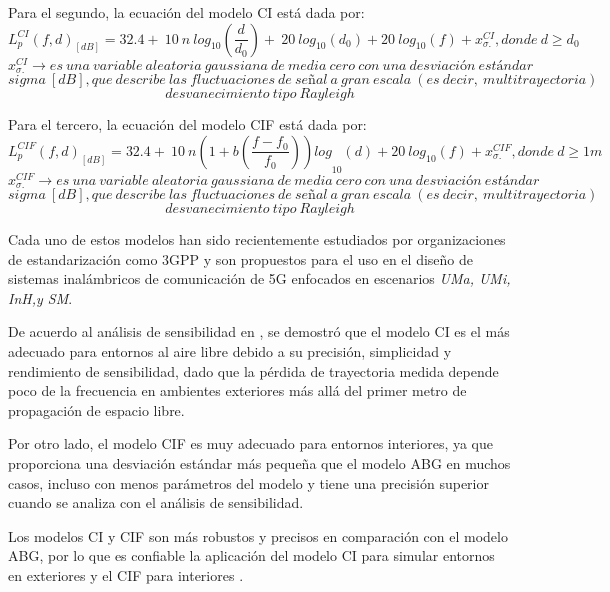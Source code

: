 Para el segundo, la ecuación del modelo CI está dada por:
\begin{equation}
    L^{CI}_p(f,d)_{\left[dB\right]}=32.4+\ 10\ n{\ log}_{10}\left(\frac{d}{d_0}\right)+{\ 20\ log}_{10}\left(d_0\right)+{20\ log}_{10}\left(f\right)+x^{CI}_{\sigma .}, donde\ d\ge d_0
    \label{eqn:CI}
\end{equation}
\[x^{CI}_{\sigma .}\to es\ una\ variable\ aleatoria\ gaussiana\ de\ media\ cero\ con\ una\ desviaci\textrm{ó}n\ est\textrm{á}ndar \]
\[sigma \ [dB], que\ describe\ las\ fluctuaciones\ de\ se\textrm{ñ}al\ a\ gran\ escala\ (es\ decir,\ multitrayectoria)\]
\[desvanecimiento\ tipo\ Rayleigh\] 

Para el tercero, la ecuación del modelo CIF está dada por:
\begin{equation}
    L^{CIF}_p(f,d)_{\left[dB\right]}=32.4+\ 10\ n{\left(1+b \left(\frac{f-f_0}{f_0}\right) \right)log}_{10}\left(d\right)+{20\ log}_{10}\left(f\right)+x^{CIF}_{\sigma .},  donde\ d\ge 1m
    \label{eqn:CIF}
\end{equation}
\[x^{CIF}_{\sigma .}\to es\ una\ variable\ aleatoria\ gaussiana\ de\ media\ cero\ con\ una\ desviaci\textrm{ó}n\ est\textrm{á}ndar  \]
\[ sigma \ [dB], que\ describe\ las\ fluctuaciones\ de\ se\textrm{ñ}al\ a\ gran\ escala\ (es\ decir,\ multitrayectoria)\]
\[desvanecimiento\ tipo\ Rayleigh\] 

Cada uno de estos modelos han sido recientemente estudiados por organizaciones de estandarización como 3GPP y son propuestos para el uso en el diseño de sistemas inalámbricos de comunicación de 5G enfocados en escenarios \textit{UMa, UMi, InH,y SM}.\newline

De acuerdo al análisis de sensibilidad en \parencite{Sun2016}, se demostró que el modelo CI es el más adecuado para entornos al aire libre debido a su precisión, simplicidad y rendimiento de sensibilidad, dado que la pérdida de trayectoria medida depende poco de la frecuencia en ambientes exteriores más allá del primer metro de propagación de espacio libre.\newline

Por otro lado, el modelo CIF es muy adecuado para entornos interiores, ya que proporciona una desviación estándar más pequeña que el modelo ABG en muchos casos, incluso con menos parámetros del modelo y tiene una precisión superior cuando se analiza con el análisis de sensibilidad.\newline

Los modelos CI y CIF son más robustos y precisos en comparación con el modelo ABG, por lo que es confiable la aplicación del modelo CI para simular entornos en exteriores y el CIF para interiores \parencite{Sun2016}.\newline

